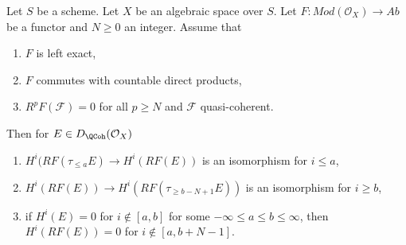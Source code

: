 \begin{lemma}
\label{lemma-application-nice-K-injective}
Let $S$ be a scheme. Let $X$ be an algebraic space over $S$.
Let $F : \textit{Mod}(\mathcal{O}_X) \to \textit{Ab}$
be a functor and $N \geq 0$ an integer. Assume that
\begin{enumerate}
\item $F$ is left exact,
\item $F$ commutes with countable direct products,
\item $R^pF(\mathcal{F}) = 0$ for all $p \geq N$ and $\mathcal{F}$
quasi-coherent.
\end{enumerate}
Then for $E \in D_\QCoh(\mathcal{O}_X)$
\begin{enumerate}
\item $H^i(RF(\tau_{\leq a}E) \to H^i(RF(E))$ is an isomorphism
for $i \leq a$,
\item $H^i(RF(E)) \to H^i(RF(\tau_{\geq b - N + 1}E))$ is an isomorphism
for $i \geq b$,
\item if $H^i(E) = 0$ for $i \not \in [a, b]$ for some
$-\infty \leq a \leq b \leq \infty$, then $H^i(RF(E)) = 0$
for $i \not \in [a, b + N - 1]$.
\end{enumerate}
\end{lemma}

